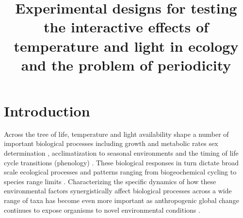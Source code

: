 \documentclass[11pt]{article}
\title{Experimental designs for testing the interactive effects of temperature and light in ecology and the problem of periodicity }
\begin{document}
\maketitle
\section{Introduction}
\noindent Across the tree of life, temperature and light availability shape a number of important biological processes including growth and metabolic rates \citep{MacLean:2019aa} sex determination \citep{Brown:2014vn}, acclimatization to seasonal environments \citep{Hamilton2016} and the timing of life cycle transitions (phenology) \citep{Forrest2010}. These biological responses in turn dictate broad scale ecological processes and patterns ranging from biogeochemical cycling \citep{Piao2007} to species range limits \citep{Chuine2001}. Characterizing the specific dynamics of how these environmental factors synergistically affect biological processes across a wide range of taxa has become even more important as anthropogenic global change continues to expose organisms to novel environmental conditions \citep{Portner:2008vd}.

\end{document}
